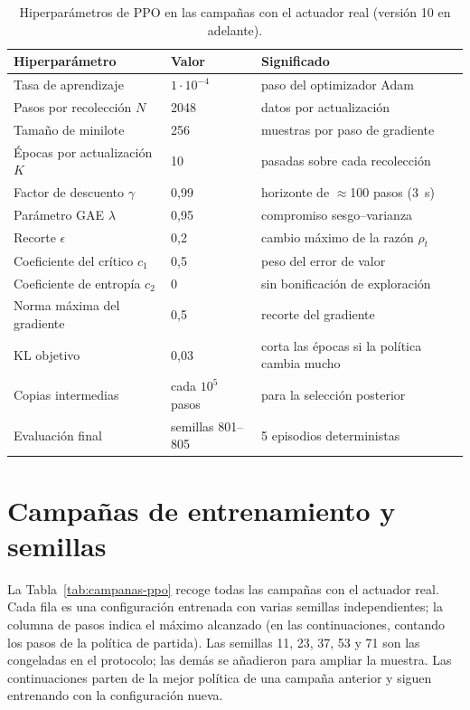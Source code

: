 \begin{table}[H]
\centering
\caption{Hiperparámetros de PPO en las campañas con el actuador real (versión 10 en adelante).}
\label{tab:hiperparametros-ppo}
\small
\begin{tabular}{lll}
\toprule
Hiperparámetro & Valor & Significado \\
\midrule
Tasa de aprendizaje & $1\cdot10^{-4}$ & paso del optimizador Adam \\
Pasos por recolección $N$ & 2048 & datos por actualización \\
Tamaño de minilote & 256 & muestras por paso de gradiente \\
Épocas por actualización $K$ & 10 & pasadas sobre cada recolección \\
Factor de descuento $\gamma$ & 0,99 & horizonte de $\approx$100 pasos (3~s) \\
Parámetro GAE $\lambda$ & 0,95 & compromiso sesgo--varianza \\
Recorte $\epsilon$ & 0,2 & cambio máximo de la razón $\rho_t$ \\
Coeficiente del crítico $c_1$ & 0,5 & peso del error de valor \\
Coeficiente de entropía $c_2$ & 0 & sin bonificación de exploración \\
Norma máxima del gradiente & 0,5 & recorte del gradiente \\
KL objetivo & 0,03 & corta las épocas si la política cambia mucho \\
Copias intermedias & cada $10^5$ pasos & para la selección posterior \\
Evaluación final & semillas 801--805 & 5 episodios deterministas \\
\bottomrule
\end{tabular}
\end{table}

\section{Campañas de entrenamiento y semillas}

La Tabla~\ref{tab:campanas-ppo} recoge todas las campañas con el actuador real.
Cada fila es una configuración entrenada con varias semillas independientes; la
columna de pasos indica el máximo alcanzado (en las continuaciones, contando los
pasos de la política de partida). Las semillas 11, 23, 37, 53 y 71 son las
congeladas en el protocolo; las demás se añadieron para ampliar la muestra. Las
continuaciones parten de la mejor política de una campaña anterior y siguen
entrenando con la configuración nueva.

